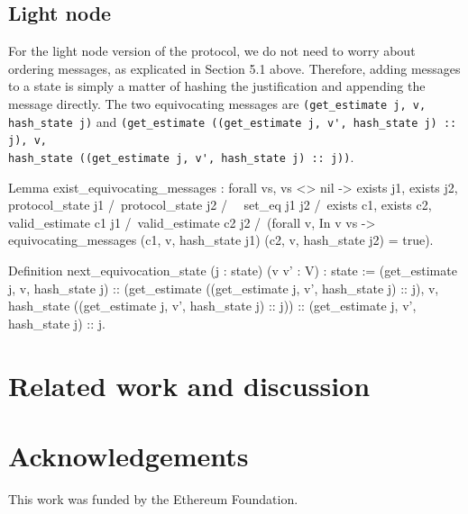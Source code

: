 \documentclass[runningheads]{llncs}
\begin{document}
\subsection{Light node}
For the light node version of the protocol, we do not need to worry about ordering messages, as explicated in Section 5.1 above. Therefore, adding messages to a state is simply a matter of hashing the justification and appending the message directly. The two equivocating messages are \verb|(get_estimate j, v, hash_state j)| and \verb|(get_estimate ((get_estimate j, v', hash_state j) :: j), v,| \\ \verb|hash_state ((get_estimate j, v', hash_state j) :: j))|.
\begin{coq}
Lemma exist_equivocating_messages : forall vs,
	vs <> nil ->
	exists j1, exists j2, protocol_state j1 /\ protocol_state j2 /\ ~ set_eq j1 j2 /\
	exists c1, exists c2,
	valid_estimate c1 j1 /\ valid_estimate c2 j2 /\
	(forall v,
	In v vs  ->
	equivocating_messages (c1, v, hash_state j1)
												(c2, v, hash_state j2) = true).

Definition next_equivocation_state (j : state) (v v' : V) : state :=
	(get_estimate j, v, hash_state j)
	::
	(get_estimate ((get_estimate j, v', hash_state j) :: j), v,
	hash_state ((get_estimate j, v', hash_state j) :: j))
	::
	(get_estimate j, v', hash_state j)
	::
	j.
\end{coq}

\section{Related work and discussion}
\label{sec:related}


\section{Acknowledgements}
This work was funded by the Ethereum Foundation.
\end{document}
